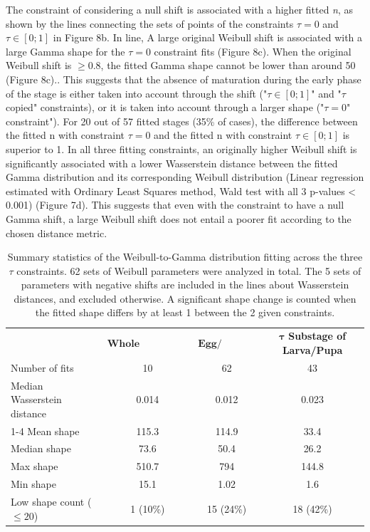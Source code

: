 \documentclass[12pt,a4paper,onecolumn]{article}
\begin{document}
\tabto{1 cm} The constraint of considering a null shift is associated with a higher fitted \textit{n}, as shown by the lines connecting the sets of points of the constraints $\tau = 0$ and $\tau \in [0;1]$ in Figure 8b. In line, A large original Weibull shift is associated with a large Gamma shape for the $\tau = 0$ constraint fits (Figure 8c). When the original Weibull shift is $\geq 0.8$, the fitted Gamma shape cannot be lower than around 50 (Figure 8c).. This suggests that the absence of maturation during the early phase of the stage is either taken into account through the shift ("$\tau \in [0;1]$" and "$\tau$ copied" constraints), or it is taken into account through a larger shape ("$\tau = 0$" constraint"). For 20 out of 57 fitted stages (35\% of cases), the difference between the fitted n with constraint $\tau = 0$ and the fitted n with constraint $\tau \in [0;1]$ is superior to 1. In all three fitting constraints, an originally higher Weibull shift is significantly associated with a lower Wasserstein distance between the fitted Gamma distribution and its corresponding Weibull distribution (Linear regression estimated with Ordinary Least Squares method, Wald test with all 3 p-values < 0.001) (Figure 7d). This suggests that even with the constraint to have a null Gamma shift, a large Weibull shift does not entail a poorer fit according to the chosen distance metric.





\begin{table}[h]
\centering
\begin{tabular}{lccc}
\toprule
\textbf{} & $\boldsymbol{\textbf{Whole development}}$ & $\boldsymbol{\textbf{Egg/Larva/Pupa}}$ & $\boldsymbol{\tau}$ \textbf{Substage of Larva/Pupa} \\
Number of fits & 10 & 62 & 43 \\ 
\midrule
Median Wasserstein distance & 0.014 & 0.012 & 0.023 \\
\cmidrule{1-4}
Mean shape & 115.3 & 114.9 & 33.4 \\
Median shape & 73.6 & 50.4 & 26.2 \\
Max shape & 510.7 & 794 & 144.8 \\
Min shape & 15.1 & 1.02 & 1.6 \\
Low shape count ($\leq 20$) & 1 (10\%) & 15 (24\%) & 18 (42\%) \\
\bottomrule
\end{tabular}
\caption{Summary statistics of the Weibull-to-Gamma distribution fitting across the three $\tau$ constraints.  62 sets of Weibull parameters were analyzed in total.  The 5 sets of parameters with negative shifts are included in the lines about Wasserstein distances, and excluded otherwise. A significant shape change is counted when the fitted shape differs by at least 1 between the 2 given constraints.}
\end{table}
\end{document}
